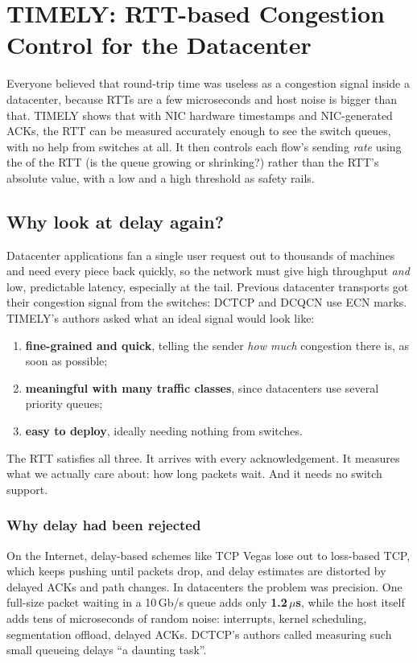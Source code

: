 \chapter{TIMELY: RTT-based Congestion Control for the Datacenter}

\begin{keybox}
Everyone believed that round-trip time was useless as a congestion signal inside a datacenter, because RTTs are a few microseconds and
host noise is bigger than that. TIMELY shows that with NIC hardware timestamps and NIC-generated ACKs, the RTT can be measured accurately
enough to see the switch queues, with no help from switches at all. It then controls each flow's sending \emph{rate} using the
 of the RTT (is the queue growing or shrinking?) rather than the RTT's absolute value, with a low and a high threshold as
safety rails.
\end{keybox}

\section{Why look at delay again?}

Datacenter applications fan a single user request out to thousands of machines and need every piece back quickly, so the network must give
high throughput \emph{and} low, predictable latency, especially at the tail. Previous datacenter transports got their congestion
signal from the switches: DCTCP and DCQCN use ECN marks. TIMELY's authors asked what an ideal signal would look like:
\begin{enumerate}
  \item \textbf{fine-grained and quick}, telling the sender \emph{how much} congestion there is, as soon as possible;
  \item \textbf{meaningful with many traffic classes}, since datacenters use several priority queues;
  \item \textbf{easy to deploy}, ideally needing nothing from switches.
\end{enumerate}
The RTT satisfies all three. It arrives with every acknowledgement. It measures what we actually care about: how long packets wait.
And it needs no switch support.

\subsection{Why delay had been rejected}
On the Internet, delay-based schemes like TCP Vegas lose out to loss-based TCP, which keeps pushing until packets drop, and delay
estimates are distorted by delayed ACKs and path changes. In datacenters the problem was precision. One full-size packet waiting in a
10\,Gb/s queue adds only \textbf{1.2\,$\mu$s}, while the host itself adds tens of microseconds of random noise: interrupts, kernel
scheduling, segmentation offload, delayed ACKs. DCTCP's authors called measuring such small queueing delays ``a daunting task''.

